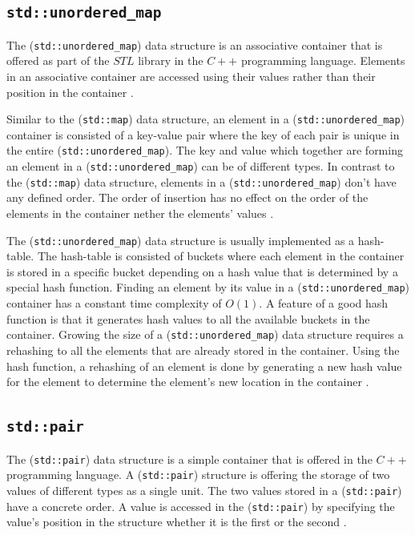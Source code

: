 {\subsection{\texttt{std::unordered\_map}}
\label{subsec:unorderedmap}

The (\texttt{std::unordered\_map}) data structure is an associative container that is offered as part of the $STL$ library in the $C++$ programming language. Elements in an associative container are accessed using their values rather than their position in the container \cite{josuttis2012c++}.

Similar to the (\texttt{std::map}) data structure, an element in a (\texttt{std::unordered\_map}) container is consisted of a key-value pair where the key of each pair is unique in the entire (\texttt{std::unordered\_map}). The key and value which together are forming an element in a (\texttt{std::unordered\_map}) can be of different types. In contrast to the (\texttt{std::map}) data structure, elements in a (\texttt{std::unordered\_map}) don't have any defined order. The order of insertion has no effect on the order of the elements in the container nether the elements' values \cite{josuttis2012c++}. 

The (\texttt{std::unordered\_map}) data structure is usually implemented as a hash-table. The hash-table is consisted of buckets where each element in the container is stored in a specific bucket depending on a hash value that is determined by a special hash function. Finding an element by its value in a (\texttt{std::unordered\_map}) container has a constant time complexity of $O(1)$. A feature of a good hash function is that it generates hash values to all the available buckets in the container. Growing the size of a (\texttt{std::unordered\_map}) data structure requires a rehashing to all the elements that are already stored in the container. Using the hash function, a rehashing of an element is done by generating a new hash value for the element to determine the element's new location in the container \cite{josuttis2012c++}.


\subsection{\texttt{std::pair}}
\label{subsec:pair}

The (\texttt{std::pair}) data structure is a simple container that is offered in the $C++$ programming language. A (\texttt{std::pair}) structure is offering the storage of two values of different types as a single unit. The two values stored in a (\texttt{std::pair}) have a concrete order. A value is accessed in the (\texttt{std::pair}) by specifying the value's position in the structure whether it is the first or the second \cite{josuttis2012c++}.

}

